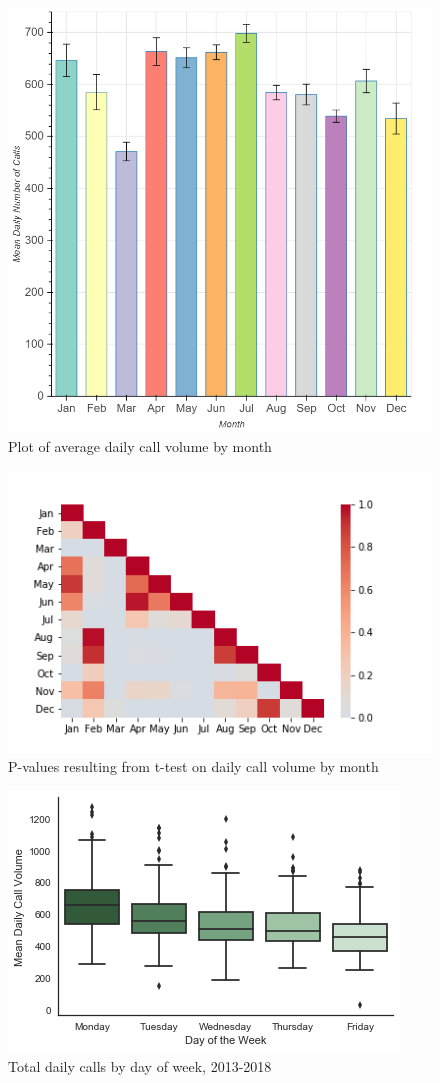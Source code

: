 \documentclass{article}
\begin{document}
\begin{figure}[p]
  \includegraphics[scale=.27]{month_bar.png}
  \caption{Plot of average daily call volume by month}
\end{figure}

\begin{figure}[p]
	\includegraphics[scale=.5]{Heatmap.png}
	\caption{P-values resulting from t-test on daily call volume by month}
\end{figure}


\begin{figure}[p]
	\includegraphics[scale=.6]{Daily_Call_Boxplot.png}
	\caption{Total daily calls by day of week, 2013-2018}
\end{figure}
\end{document}
